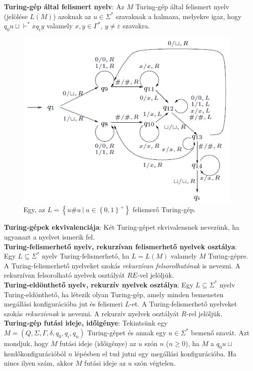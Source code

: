\documentclass[margin=0px]{article}
\begin{document}
\noindent \textbf{Turing-gép által felismert nyelv}: Az $M$ Turing-gép által felismert nyelv (jelölése $L(M)$)
azoknak az $u \in \Sigma^{*}$ szavaknak a halmaza, melyekre igaz, hogy $q_{0}u\sqcup \vdash^{*} xq_{i}y$
valamely $x,y \in \Gamma^{*}$, $y \not = \varepsilon$ szavakra.

\begin{figure}[H]
    \centering
    \includegraphics[width=0.6\linewidth]{img/turinggep_pelda}
    \caption{Egy, az $L = \left\{u\#u \ | \ u \in \left\{0,1\right\}^{+}\right\}$ felismerő Turing-gép.}
    \label{fig:turinggep_pelda}
\end{figure}

\noindent \textbf{Turing-gépek ekvivalenciája}: Két Turing-gépet ekvivalensnek nevezünk, ha ugyanazt a nyelvet ismerik fel.\\

\noindent \textbf{Turing-felismerhető nyelv, rekurzívan felismerhető nyelvek osztálya}:
Egy $L \subseteq \Sigma^{*}$ nyelv Turing-felismerhető, ha	$L = L(M)$ valamely $M$ Turing-gépre.
A Turing-felismerhető nyelveket szokás \textit{rekurzívan felsorolhatónak} is nevezni.
A rekurzívan felsorolható nyelvek osztályát $RE$-vel jelöljük.\\

\noindent \textbf{Turing-eldönthető nyelv, rekurzív nyelvek osztálya}:
Egy $L \subseteq \Sigma^{*}$ nyelv Turing-eldönthető, ha létezik olyan Turing-gép,
amely minden bemeneten megállási konfigurációba jut és felismeri $L$-et.
A Turing-felismerhető nyelveket szokás \textit{rekurzívnak} is nevezni.
A rekurzív nyelvek osztályát $R$-rel jelöljük.\\

\noindent \textbf{Turing-gép futási ideje, időigénye}:
Tekintsünk egy $M = (Q, \Sigma, \Gamma, \delta, q_{0}, q_{i}, q_{n})$ Turing-gépet és annak egy
$u \in \Sigma^{*}$ bemenő szavát. Azt mondjuk, hogy $M$ futási ideje (időigénye) az $u$ szón $n$ ($n \geq 0$),
ha $M$ a $q_{0}u\sqcup$ kezdőkonfigurációból $n$ lépésben el tud jutni egy megállási konfigurációba. Ha nincs ilyen
szám, akkor $M$ futási ideje az $u$ szón végtelen.
\end{document}
